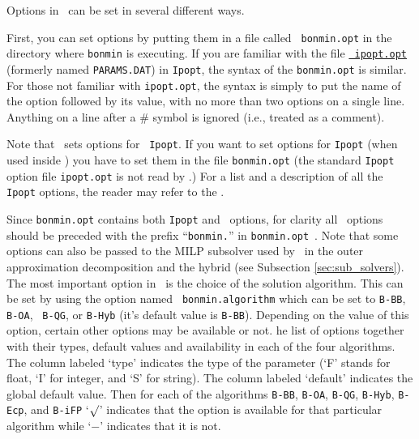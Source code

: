 
\begin{PageSummary}
\end{PageSummary}


Options in \Bonmin\ can be set in several different ways.

First, you can set options by putting them in a file called {\tt
bonmin.opt} in the directory where {\tt bonmin} is executing. If you
are familiar with the file
\href{\IpoptDoc{50}}{\tt
ipopt.opt} (formerly named {\tt PARAMS.DAT}) in {\tt Ipopt}, the
syntax of the {\tt bonmin.opt} is similar. For those not familiar
with {\tt ipopt.opt}, the syntax is simply to put the name of the
option followed by its value, with no more than two options on a
single line. Anything on a line after a \# symbol is ignored (i.e.,
treated as a comment).

Note that \Bonmin\ sets options for {\tt
Ipopt}. If you want to set options for {\tt Ipopt} (when used inside \Bonmin) you have to set them
in the file {\tt bonmin.opt} (the standard {\tt Ipopt} option file {\tt ipopt.opt}
is not read by \Bonmin.)
For a list and a description of all the {\tt Ipopt} options, the
reader may refer to the
.

Since {\tt bonmin.opt} contains both {\tt Ipopt} and \Bonmin\ options, for clarity
all \Bonmin\ options should be preceded with the prefix ``{\tt bonmin.}'' in {\tt bonmin.opt}~.
Note that some options can also be passed to the MILP subsolver used by \Bonmin\
in the outer approximation decomposition
and the hybrid (see Subsection \ref{sec:sub_solvers}).\\

The most important option in \Bonmin\ is the choice of the solution
algorithm. This can be set by using the option named {\tt
bonmin.algorithm} which can be set to {\tt B-BB}, {\tt B-OA}, {\tt
B-QG}, or {\tt B-Hyb} (it's default value is {\tt B-BB}). Depending
on the value of this option, certain other options may be available
or not. \latexhtml{Table \ref{tab:options} gives t}{T}he list of options together
with their types, default values and availability in each of the
four algorithms. The column labeled `type' indicates the type of the
parameter (`F' stands for float, `I' for integer, and `S' for
string). The column labeled `default' indicates the global default
value. Then for each of the algorithms {\tt B-BB}, {\tt B-OA},
{\tt B-QG}, {\tt B-Hyb}, {\tt B-Ecp}, and {\tt B-iFP} `$\surd$' indicates that the option is
available for that particular algorithm
while `$-$' indicates that it is not.\\


